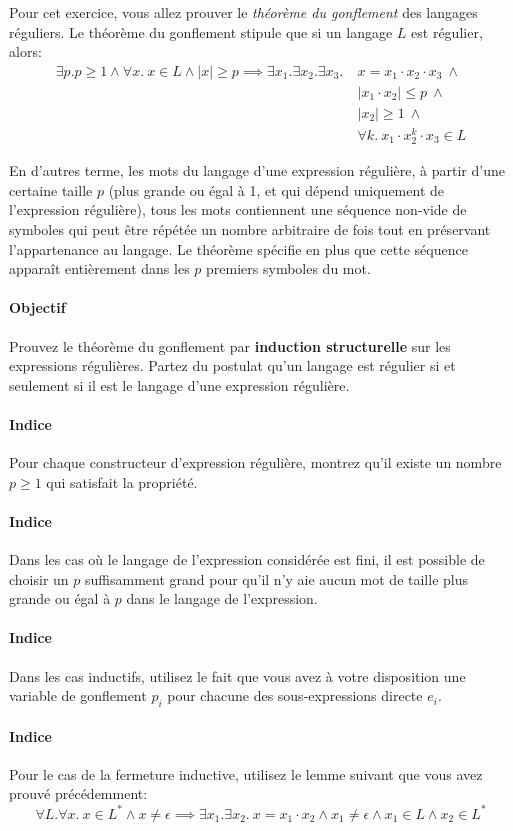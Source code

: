 \documentclass[12pt,french,a4paper]{article}
\begin{document}
\begin{question}
Pour cet exercice, vous allez prouver le \textit{théorème du gonflement} des langages réguliers.
Le théorème du gonflement stipule que si un langage $L$ est régulier, alors:
\begin{align*}
\exists p. p \geq 1 \wedge \forall x.\ x \in L \wedge |x| \geq p \implies \exists x_1. \exists x_2. \exists x_3.\ &x = x_1 \cdot x_2 \cdot x_3\ \wedge\\
&|x_1 \cdot x_2| \leq p\ \wedge\\
&|x_2| \geq 1\ \wedge\\
&\forall k.\ x_1 \cdot x_2^k \cdot x_3 \in L
\end{align*}

En d'autres terme, les mots du langage d'une expression régulière, à partir d'une certaine taille $p$ (plus grande ou égal à 1, et qui dépend uniquement de l'expression régulière), tous les mots contiennent une séquence non-vide de symboles qui peut être répétée un nombre arbitraire de fois tout en préservant l'appartenance au langage.
Le théorème spécifie en plus que cette séquence apparaît entièrement dans les $p$ premiers symboles du mot. 

\paragraph{Objectif} Prouvez le théorème du gonflement par \textbf{induction structurelle} sur les expressions régulières.
Partez du postulat qu'un langage est régulier si et seulement si il est le langage d'une expression régulière.

\paragraph{Indice} Pour chaque constructeur d'expression régulière, montrez qu'il existe un nombre $p \geq 1$ qui satisfait la propriété.

\paragraph{Indice} Dans les cas où le langage de l'expression considérée est fini, il est possible de choisir un $p$ suffisamment grand pour qu'il n'y aie aucun mot de taille plus grande ou égal à $p$ dans le langage de l'expression.

\paragraph{Indice} Dans les cas inductifs, utilisez le fait que vous avez à votre disposition une variable de gonflement $p_i$ pour chacune des sous-expressions directe $e_i$.

\paragraph{Indice} Pour le cas de la fermeture inductive, utilisez le lemme suivant que vous avez prouvé précédemment:
\[
\forall L. \forall x.\ x \in L^* \wedge x \neq \epsilon \implies \exists x_1. \exists x_2.\ x = x_1 \cdot x_2 \wedge x_1 \neq \epsilon \wedge x_1 \in L \wedge x_2 \in L^* 
\]
\end{question}
\end{document}
